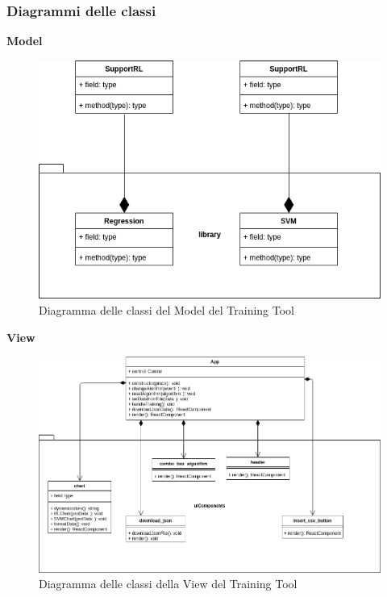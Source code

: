 \subsubsection{Diagrammi delle classi}
\textbf{Model}
\begin{figure}[H]
\centering
\includegraphics[scale=0.5]{../../Diagrams/Classes_diagrams/tool_model.png}
\caption{Diagramma delle classi del Model del Training Tool}
\end{figure}
\pagebreak
\textbf{View}
\begin{figure}[H]
\centering
\includegraphics[scale=0.5]{../../Diagrams/Classes_diagrams/tool_view.png}
\caption{Diagramma delle classi della View del Training Tool}
\end{figure}

